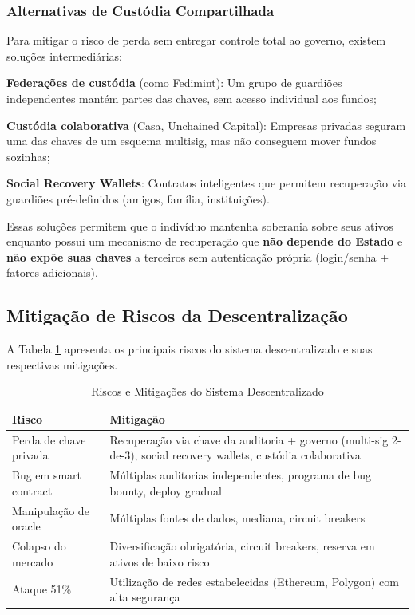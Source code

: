 \subsubsection{Alternativas de Custódia Compartilhada}

Para mitigar o risco de perda sem entregar controle total ao governo, existem soluções intermediárias:

\begin{alineas}
    \item \textbf{Federações de custódia} (como Fedimint): Um grupo de guardiões independentes mantém partes das chaves, sem acesso individual aos fundos;
    \item \textbf{Custódia colaborativa} (Casa, Unchained Capital): Empresas privadas seguram uma das chaves de um esquema multisig, mas não conseguem mover fundos sozinhas;
    \item \textbf{Social Recovery Wallets}: Contratos inteligentes que permitem recuperação via guardiões pré-definidos (amigos, família, instituições).
\end{alineas}

Essas soluções permitem que o indivíduo mantenha soberania sobre seus ativos enquanto possui um mecanismo de recuperação que \textbf{não depende do Estado} e \textbf{não expõe suas chaves} a terceiros sem autenticação própria (login/senha + fatores adicionais).

\subsection{Mitigação de Riscos da Descentralização}

A Tabela \ref{tab:riscos-mitigacao} apresenta os principais riscos do sistema descentralizado e suas respectivas mitigações.

\begin{table}[htb]
    \centering
    \caption{Riscos e Mitigações do Sistema Descentralizado}
    \label{tab:riscos-mitigacao}
    \begin{tabular}{p{4cm}p{8cm}}
        \toprule
        \textbf{Risco} & \textbf{Mitigação} \\
        \midrule
        Perda de chave privada & Recuperação via chave da auditoria + governo (multi-sig 2-de-3), social recovery wallets, custódia colaborativa \\
        Bug em smart contract & Múltiplas auditorias independentes, programa de bug bounty, deploy gradual \\
        Manipulação de oracle & Múltiplas fontes de dados, mediana, circuit breakers \\
        Colapso do mercado & Diversificação obrigatória, circuit breakers, reserva em ativos de baixo risco \\
        Ataque 51\% & Utilização de redes estabelecidas (Ethereum, Polygon) com alta segurança \\
        \bottomrule
    \end{tabular}
\end{table}
